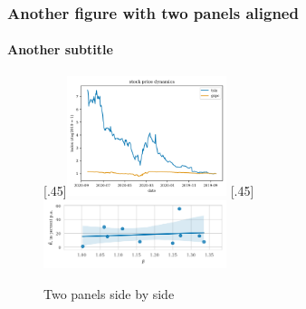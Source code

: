 \documentclass{beamer}
\begin{document}
\begin{frame}
    \frametitle{Another figure with two panels aligned}
    \framesubtitle{Another subtitle}
    \begin{figure}[H]
        \centering
          [.45\linewidth]{\includegraphics[height=3.5cm]{stock-index-weird-plot.png}}
          [.45\linewidth]{\includegraphics[height=2cm]{beta-vs-mu.png}}
    \caption{Two panels side by side}    
    \end{figure}        
\end{frame}

\end{document}

